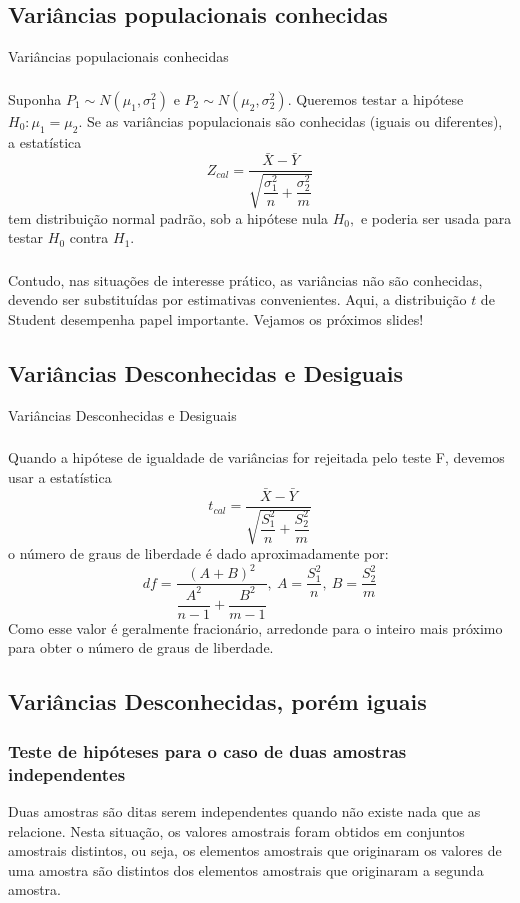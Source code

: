 \documentclass[14pt,aspectratio=1610]{beamer}
\newcommand{\Ho}{\ensuremath{H_{0}}}
\newcommand{\Hi}{\ensuremath{H_{1}}}
\begin{document}
\subsection{Variâncias populacionais conhecidas}
\begin{frame}{Variâncias populacionais conhecidas}
\frametitle{}
\begin{block}{}
\justifying
Suponha $P_{1}\sim N(\mu_{1},\sigma_{1}^{2})$ e $P_{2}\sim N(\mu_{2},\sigma_{2}^{2}).$ Queremos testar a hipótese $H_{0}:\mu_{1}=\mu_{2}.$ Se as variâncias populacionais são conhecidas (iguais ou diferentes), a estatística $$Z_{cal}=\dfrac{\bar{X}-\bar{Y}}{\sqrt{\dfrac{\sigma_{1}^{2}}{n}+\dfrac{\sigma_{2}^{2}}{m}}}$$ tem distribuição normal padrão, sob a hipótese nula $H_{0},$ e poderia ser usada para testar $\Ho$ contra $\Hi$.
\end{block}
\end{frame}

\begin{frame}{}
\frametitle{}
\begin{block}{}
\justifying
Contudo, nas situações de interesse prático, as variâncias não são conhecidas, devendo ser substituídas por estimativas convenientes. Aqui, a distribuição $t$ de Student desempenha papel importante. Vejamos os próximos slides!
\end{block}
\end{frame}

\subsection{Variâncias Desconhecidas e Desiguais}
\begin{frame}{Variâncias Desconhecidas e Desiguais}
\frametitle{}
\begin{block}{}
\justifying
Quando a hipótese de igualdade de variâncias for rejeitada pelo teste F, devemos usar a estatística $$t_{cal}=\dfrac{\bar{X}-\bar{Y}}{\sqrt{\dfrac{S_{1}^{2}}{n}+\dfrac{S_{2}^{2}}{m}}}$$ o número de graus de liberdade é dado aproximadamente por:
$$df=\dfrac{(A+B)^{2}}{\dfrac{A^{2}}{n-1}+\dfrac{B^{2}}{m-1}},\ 
A=\dfrac{S_{1}^{2}}{n},\ B=\dfrac{S_{2}^{2}}{m}$$
Como esse valor é geralmente fracionário, arredonde para o inteiro mais próximo
para obter o número de graus de liberdade.
\end{block}
\end{frame}

\subsection{Variâncias Desconhecidas, porém iguais}
\begin{frame}{}
\frametitle{Teste de hipóteses para o caso de duas amostras independentes}
\begin{block}{}
\justifying
Duas amostras são ditas serem independentes quando não existe nada que as relacione. Nesta situação, os valores amostrais foram obtidos em conjuntos amostrais distintos, ou seja, os elementos amostrais que originaram os valores de uma amostra são distintos dos elementos amostrais que originaram a segunda amostra.
\end{block}
\end{frame}
\end{document}
